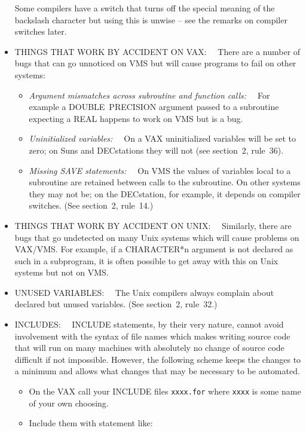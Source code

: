 \documentclass[twoside,11pt,nolof,noabs]{starlink}
\renewcommand{\_}{{\tt\char'137}}
\begin{document}
\begin{itemize}
  Some compilers have a switch that turns off the special meaning of the
  backslash character but using this is unwise -- see the remarks
  on compiler switches later.
 \item THINGS THAT WORK BY ACCIDENT ON VAX:~~
  There are a number of bugs that can go unnoticed on VMS but will cause
  programs to fail on other systems:
  \begin{itemize}
   \item \textit{Argument mismatches across subroutine and function calls:~~}
    For example a DOUBLE~PRECISION argument passed to a subroutine
    expecting a REAL happens to work on VMS but is a bug.
   \item \textit{Uninitialized variables:~~}
    On a VAX uninitialized variables will be set to zero;  on Suns and
    DECstations they will not (see section~2, rule~36).
   \item \textit{Missing SAVE statements:~~}
    On VMS the values of variables local to a subroutine are retained
    between calls to the subroutine.  On other systems they may not be;
    on the DECstation, for example, it depends on compiler switches.
    (See section~2, rule~14.)
  \end{itemize}
 \item THINGS THAT WORK BY ACCIDENT ON UNIX:~~
  Similarly, there are bugs that go undetected on many Unix systems
  which will cause problems on VAX/VMS.  For example, if a CHARACTER*n
  argument is not declared as such in a subprogram, it is often
  possible to get away with this on Unix systems but not on VMS.
 \item UNUSED VARIABLES:~~
  The Unix compilers always complain about declared but unused variables.
  (See section~2, rule~32.)
 \item INCLUDES:~~
  INCLUDE statements, by their very nature, cannot avoid involvement with
  the syntax of file names which makes writing source code that will run
  on many machines with absolutely no change of source code difficult if
  not impossible. However, the following scheme keeps the changes to a
  minimum and allows what changes that may be necessary to be automated.
  \begin{itemize}
   \item On the VAX call your INCLUDE files \verb|xxxx.for| where
    \verb|xxxx| is some name of your own choosing.
   \item Include them with statement like:
    \begin{quote}
    \begin{terminalv}

\end{terminalv}
\end{quote}
\end{itemize}
\end{itemize}
\end{document}
